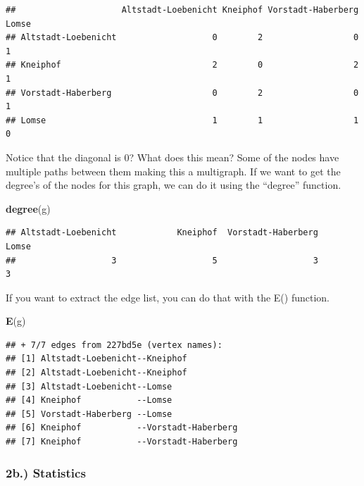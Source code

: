 \documentclass[
]{article}
\newenvironment{Shaded}{\begin{snugshade}}{\end{snugshade}}
\newcommand{\FunctionTok}[1]{\textcolor[rgb]{0.13,0.29,0.53}{\textbf{#1}}}
\newcommand{\NormalTok}[1]{#1}
\begin{document}
\begin{verbatim}
##                     Altstadt-Loebenicht Kneiphof Vorstadt-Haberberg Lomse
## Altstadt-Loebenicht                   0        2                  0     1
## Kneiphof                              2        0                  2     1
## Vorstadt-Haberberg                    0        2                  0     1
## Lomse                                 1        1                  1     0
\end{verbatim}

Notice that the diagonal is 0? What does this mean? Some of the nodes
have multiple paths between them making this a multigraph. If we want to
get the degree's of the nodes for this graph, we can do it using the
``degree'' function.

\begin{Shaded}
\begin{Highlighting}[]
\FunctionTok{degree}\NormalTok{(g)}
\end{Highlighting}
\end{Shaded}

\begin{verbatim}
## Altstadt-Loebenicht            Kneiphof  Vorstadt-Haberberg               Lomse 
##                   3                   5                   3                   3
\end{verbatim}

If you want to extract the edge list, you can do that with the E()
function.

\begin{Shaded}
\begin{Highlighting}[]
\FunctionTok{E}\NormalTok{(g)}
\end{Highlighting}
\end{Shaded}

\begin{verbatim}
## + 7/7 edges from 227bd5e (vertex names):
## [1] Altstadt-Loebenicht--Kneiphof          
## [2] Altstadt-Loebenicht--Kneiphof          
## [3] Altstadt-Loebenicht--Lomse             
## [4] Kneiphof           --Lomse             
## [5] Vorstadt-Haberberg --Lomse             
## [6] Kneiphof           --Vorstadt-Haberberg
## [7] Kneiphof           --Vorstadt-Haberberg
\end{verbatim}

\subsubsection{2b.) Statistics}\label{b.-statistics}
\end{document}
